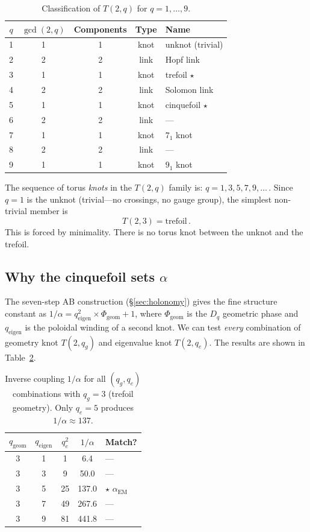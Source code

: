 \documentclass[11pt]{article}
\begin{document}
\begin{table}[h]
\centering
\caption{Classification of $T(2,q)$ for $q = 1, \ldots, 9$.}
\label{tab:knot-link}
\begin{tabular}{ccccl}
\toprule
$q$ & $\gcd(2,q)$ & Components & Type & Name \\
\midrule
1 & 1 & 1 & knot & unknot (trivial)\\
2 & 2 & 2 & link & Hopf link\\
3 & 1 & 1 & knot & trefoil $\star$\\
4 & 2 & 2 & link & Solomon link\\
5 & 1 & 1 & knot & cinquefoil $\star$\\
6 & 2 & 2 & link & ---\\
7 & 1 & 1 & knot & $7_1$ knot\\
8 & 2 & 2 & link & ---\\
9 & 1 & 1 & knot & $9_1$ knot\\
\bottomrule
\end{tabular}
\end{table}

The sequence of torus \emph{knots} in the $T(2,q)$ family is:
$q = 1, 3, 5, 7, 9, \ldots$\,.  Since $q = 1$ is the unknot
(trivial---no crossings, no gauge group), the simplest non-trivial
member is
\begin{equation}
\boxed{T(2,3) = \text{trefoil}\,.}
\end{equation}
This is forced by minimality.  There is no torus knot between the
unknot and the trefoil.

\subsection{Why the cinquefoil sets $\alpha$}
\label{sec:why-cinquefoil}

The seven-step AB construction (\S\ref{sec:holonomy}) gives the
fine structure constant as
$1/\alpha = q_\text{eigen}^2 \times \Phi_\text{geom} + 1$,
where $\Phi_\text{geom}$ is the $D_q$ geometric phase and
$q_\text{eigen}$ is the poloidal winding of a second knot.  We
can test \emph{every} combination of geometry knot $T(2,q_g)$ and
eigenvalue knot $T(2,q_e)$.  The results are shown in
Table~\ref{tab:alpha-scan}.

\begin{table}[h]
\centering
\caption{Inverse coupling $1/\alpha$ for all $(q_g, q_e)$
combinations with $q_g = 3$ (trefoil geometry).  Only
$q_e = 5$ produces $1/\alpha \approx 137$.}
\label{tab:alpha-scan}
\begin{tabular}{ccccl}
\toprule
$q_\text{geom}$ & $q_\text{eigen}$ & $q_e^2$ & $1/\alpha$ & Match? \\
\midrule
3 & 1 &  1 &   6.4  & ---\\
3 & 3 &  9 &  50.0  & ---\\
3 & 5 & 25 & 137.0  & $\star$ $\alpha_\text{EM}$\\
3 & 7 & 49 & 267.6  & ---\\
3 & 9 & 81 & 441.8  & ---\\
\bottomrule
\end{tabular}
\end{table}
\end{document}
